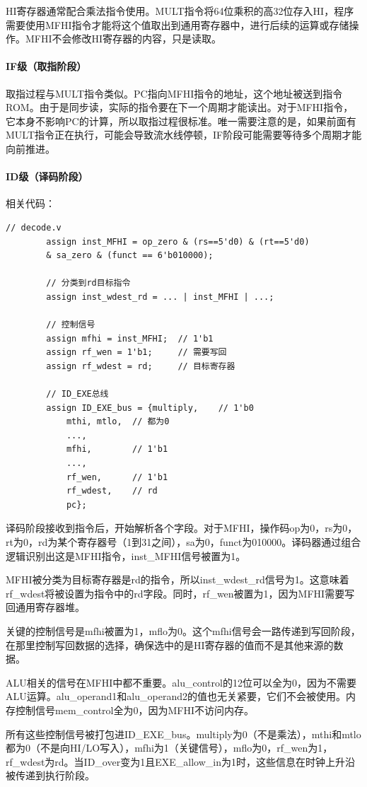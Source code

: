 \documentclass[a4paper]{article}
\begin{document}
	HI寄存器通常配合乘法指令使用。MULT指令将64位乘积的高32位存入HI，程序需要使用MFHI指令才能将这个值取出到通用寄存器中，进行后续的运算或存储操作。MFHI不会修改HI寄存器的内容，只是读取。
	\paragraph{IF级（取指阶段）}
	取指过程与MULT指令类似。PC指向MFHI指令的地址，这个地址被送到指令ROM。由于是同步读，实际的指令要在下一个周期才能读出。对于MFHI指令，它本身不影响PC的计算，所以取指过程很标准。唯一需要注意的是，如果前面有MULT指令正在执行，可能会导致流水线停顿，IF阶段可能需要等待多个周期才能向前推进。
	\paragraph{ID级（译码阶段）}
	相关代码：
	\begin{lstlisting}[caption={ID}]
		// decode.v
		assign inst_MFHI = op_zero & (rs==5'd0) & (rt==5'd0) 
		& sa_zero & (funct == 6'b010000);
		
		// 分类到rd目标指令
		assign inst_wdest_rd = ... | inst_MFHI | ...;
		
		// 控制信号
		assign mfhi = inst_MFHI;  // 1'b1
		assign rf_wen = 1'b1;     // 需要写回
		assign rf_wdest = rd;     // 目标寄存器
		
		// ID_EXE总线
		assign ID_EXE_bus = {multiply,    // 1'b0
			mthi, mtlo,  // 都为0
			...,
			mfhi,        // 1'b1
			...,
			rf_wen,      // 1'b1
			rf_wdest,    // rd
			pc};
	\end{lstlisting}
	
	译码阶段接收到指令后，开始解析各个字段。对于MFHI，操作码op为0，rs为0，rt为0，rd为某个寄存器号（1到31之间），sa为0，funct为010000。译码器通过组合逻辑识别出这是MFHI指令，inst\_MFHI信号被置为1。
	
	MFHI被分类为目标寄存器是rd的指令，所以inst\_wdest\_rd信号为1。这意味着rf\_wdest将被设置为指令中的rd字段。同时，rf\_wen被置为1，因为MFHI需要写回通用寄存器堆。
	
	关键的控制信号是mfhi被置为1，mflo为0。这个mfhi信号会一路传递到写回阶段，在那里控制写回数据的选择，确保选中的是HI寄存器的值而不是其他来源的数据。
	
	ALU相关的信号在MFHI中都不重要。alu\_control的12位可以全为0，因为不需要ALU运算。alu\_operand1和alu\_operand2的值也无关紧要，它们不会被使用。内存控制信号mem\_control全为0，因为MFHI不访问内存。
	
	所有这些控制信号被打包进ID\_EXE\_bus。multiply为0（不是乘法），mthi和mtlo都为0（不是向HI/LO写入），mfhi为1（关键信号），mflo为0，rf\_wen为1，rf\_wdest为rd。当ID\_over变为1且EXE\_allow\_in为1时，这些信息在时钟上升沿被传递到执行阶段。
\end{document}
